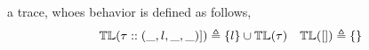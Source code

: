   a trace, whoes behavior is defined as follows,
\[
\mathbb{TL}{(\mathtt{\tau}  :: (\_, l, \_, \_)])} \triangleq \{l\} \cup \mathbb{TL}{(\mathtt{\tau} )}
~~~
\mathbb{TL}({[ ]}) \triangleq \{\}
\]
%
%
%
%
%

